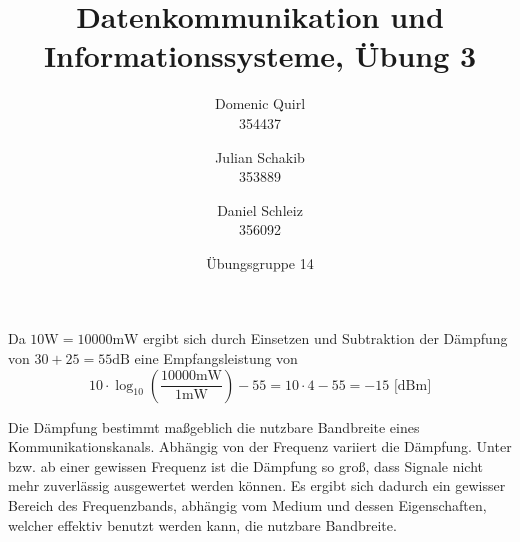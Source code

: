 \documentclass{../exercisesheet}
\title{Datenkommunikation und Informationssysteme, Übung 3}
\author{
    Domenic Quirl \\ 354437
    \and
    Julian Schakib \\ 353889
    \and 
    Daniel Schleiz \\ 356092
}
\date{Übungsgruppe 14}
\begin{document}
\maketitle
\pointtable

\begin{exercise}{1.5}
	\begin{subexercise}
	Da $10\text{W}=10000\text{mW}$ ergibt sich durch Einsetzen und Subtraktion der Dämpfung von $30 + 25 = 55\text{dB}$ eine Empfangsleistung von
	\[
		10 \cdot \log_{10}\left(\frac{10000\text{mW}}{1\text{mW}}\right) - 55 = 10 \cdot 4 - 55 = -15 \text{ [dBm]}
	\]
	\end{subexercise}
	
	\begin{subexercise}
	Die Dämpfung bestimmt maßgeblich die nutzbare Bandbreite eines Kommunikationskanals. Abhängig von der Frequenz variiert die Dämpfung. Unter bzw. ab
	einer gewissen Frequenz ist die Dämpfung so groß, dass Signale nicht mehr zuverlässig ausgewertet werden können. Es ergibt sich dadurch ein gewisser Bereich
	des Frequenzbands, abhängig vom Medium und dessen Eigenschaften, welcher effektiv benutzt werden kann, die nutzbare Bandbreite.
	\end{subexercise}
\end{exercise}
\end{document}
